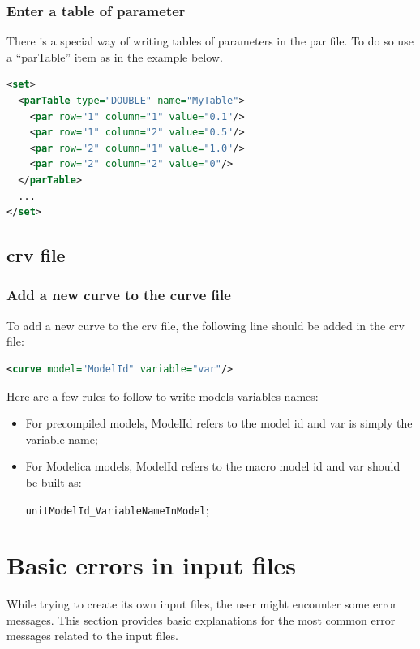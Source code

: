 \documentclass[a4paper, 12pt]{report}
\begin{document}
\subsubsection{Enter a table of parameter}

There is a special way of writing tables of parameters in the par file. To do so use a ``parTable'' item as in the example below.
\begin{lstlisting}[language=XML, morekeywords={parTable}]
<set>
  <parTable type="DOUBLE" name="MyTable">
    <par row="1" column="1" value="0.1"/>
    <par row="1" column="2" value="0.5"/>
    <par row="2" column="1" value="1.0"/>
    <par row="2" column="2" value="0"/>
  </parTable>
  ...
</set>
\end{lstlisting}

\subsection{crv file}

\subsubsection{Add a new curve to the curve file}

To add a new curve to the crv file, the following line should be added in the crv file:
\begin{lstlisting}[language=XML,numbers=none]
<curve model="ModelId" variable="var"/>
\end{lstlisting}

Here are a few rules to follow to write models variables names:
\begin{itemize}
\item For precompiled models, ModelId refers to the model id and var is simply the variable name;
\item For Modelica models, ModelId refers to the macro model id and var should be built as:

\verb|unitModelId_VariableNameInModel|;
\end{itemize}

\section{Basic errors in input files}

While trying to create its own input files, the user might encounter some error messages. This section provides basic explanations for the most common error messages related to the input files. \\
\end{document}

